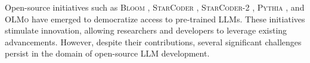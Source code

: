 
Open-source initiatives such as \textsc{Bloom} \citep{scao2022bloom}, \textsc{StarCoder} \citep{li2023starcoder}, \textsc{StarCoder-2} \citep{starcoder2}, \textsc{Pythia} \citep{biderman2023pythia}, and \textsc{OLMo} \citep{groeneveld2024olmo,soldaini2024dolma} have emerged to democratize access to pre-trained LLMs. These initiatives stimulate innovation, allowing researchers and developers to leverage existing advancements. However, despite their contributions, several significant challenges persist in the domain of open-source LLM development.

